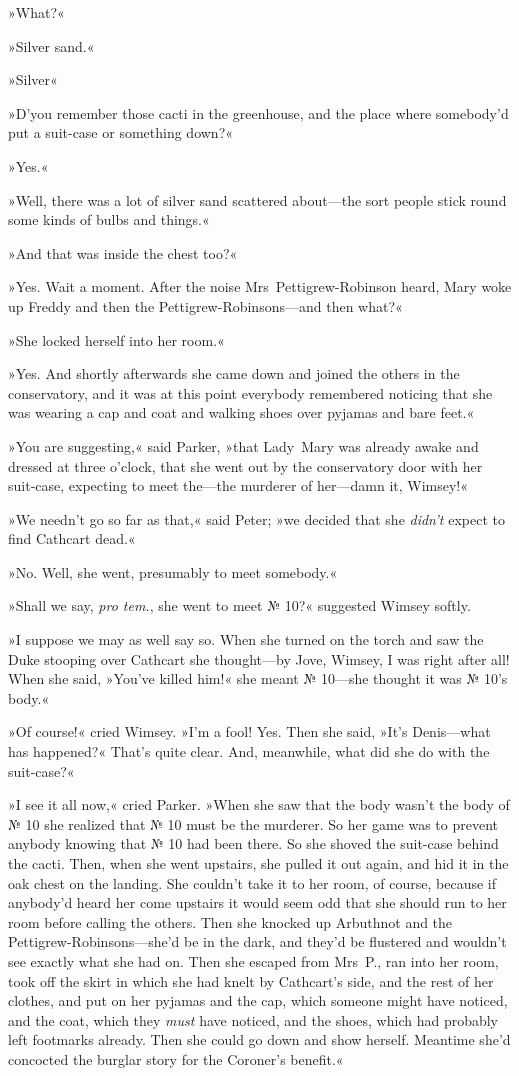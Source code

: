 »What?«

»Silver sand.«

»Silver\longdash«

»D'you remember those cacti in the greenhouse, and the place where somebody'd put a suit-case or something down?«

»Yes.«

»Well, there was a lot of silver sand scattered about—the sort people stick round some kinds of bulbs and things.«

»And that was inside the chest too?«

»Yes. Wait a moment. After the noise Mrs~Pettigrew-Robinson heard, Mary woke up Freddy and then the Pettigrew-Robinsons—and then what?«

»She locked herself into her room.«

»Yes. And shortly afterwards she came down and joined the others in the conservatory, and it was at this point everybody remembered noticing that she was wearing a cap and coat and walking shoes over pyjamas and bare feet.«

»You are suggesting,« said Parker, »that Lady~Mary was already awake and dressed at three o'clock, that she went out by the conservatory door with her suit-case, expecting to meet the—the murderer of her—damn it, Wimsey!«

»We needn't go so far as that,« said Peter; »we decided that she \textit{didn't} expect to find Cathcart dead.«

»No. Well, she went, presumably to meet somebody.«

»Shall we say, \textit{pro tem.}, she went to meet № 10?« suggested Wimsey softly.

»I suppose we may as well say so. When she turned on the torch and saw the Duke stooping over Cathcart she thought—by Jove, Wimsey, I was right after all! When she said, »You've killed him!« she meant № 10—she thought it was № 10's body.«

»Of course!« cried Wimsey. »I'm a fool! Yes. Then she said, »It's Denis—what has happened?« That's quite clear. And, meanwhile, what did she do with the suit-case?«

»I see it all now,« cried Parker. »When she saw that the body wasn't the body of № 10 she realized that № 10 must be the murderer. So her game was to prevent anybody knowing that № 10 had been there.  So she shoved the suit-case behind the cacti. Then, when she went upstairs, she pulled it out again, and hid it in the oak chest on the landing. She couldn't take it to her room, of course, because if anybody'd heard her come upstairs it would seem odd that she should run to her room before calling the others. Then she knocked up Arbuthnot and the Pettigrew-Robinsons—she'd be in the dark, and they'd be flustered and wouldn't see exactly what she had on. Then she escaped from Mrs~P., ran into her room, took off the skirt in which she had knelt by Cathcart's side, and the rest of her clothes, and put on her pyjamas and the cap, which someone might have noticed, and the coat, which they \textit{must} have noticed, and the shoes, which had probably left footmarks already. Then she could go down and show herself. Meantime she'd concocted the burglar story for the Coroner's benefit.«

